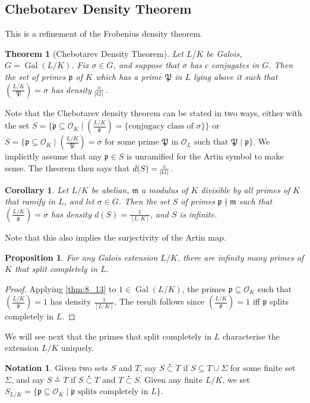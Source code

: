 \documentclass[11pt]{article}
\theoremstyle{definition}
\newtheorem{notation}[definition]{Notation}
\theoremstyle{plain}
\newtheorem{theorem}[definition]{Theorem}
\newtheorem{proposition}[definition]{Proposition}
\newtheorem{corollary}[definition]{Corollary}
\theoremstyle{remark}
\DeclareMathOperator{\Gal}{Gal}
\newcommand{\cO}{\mathcal{O}}
\newcommand{\cp}{\mathfrak{P}}
\newcommand{\fp}{\mathfrak{p}}
\newcommand{\fm}{\mathfrak{m}}
\newcommand{\leg}[2]{\left(\frac{#1}{#2}\right)}
\newcommand{\subsetdot}{\stackrel{\centerdot}{\subset}}
\newcommand{\eqdot}{\stackrel{\centerdot}{=}}
\begin{document}
\subsection{Chebotarev Density Theorem}
This is a refinement of the Frobenius density theorem.

\begin{theorem}[Chebotarev Density Theorem]\label{thm:8_13}
    Let $L/K$ be Galois, $G = \Gal(L/K)$. Fix $\sigma \in G$, and suppose that $\sigma$ has $c$ conjugates in $G$. Then the set of primes $\fp$ of $K$ which has a prime $\cp$ in $L$ lying above it such that $\leg{L/K}{\cp} = \sigma$ has density $\frac{c}{\abs{G}}$.
\end{theorem}

Note that the Chebotarev density theorem can be stated in two ways, either with the set $S = \{\fp \subseteq \cO_K \mid \leg{L/K}{\fp} = \{\text{conjugacy class of } \sigma\}\}$ or $S = \{\fp \subseteq \cO_K \mid \leg{L/K}{\cp} = \sigma \text{ for some prime } \cp \text{ in } \cO_L \text{ such that } \cp \mid \fp\}$. We implicitly assume that any $\fp \in S$ is unramified for the Artin symbol to make sense. The theorem then says that $d(S) = \frac{c}{\abs{G}}$.

\begin{corollary}\label{cor:8_14}
    Let $L/K$ be abelian, $\fm$ a modulus of $K$ divisible by all primes of $K$ that ramify in $L$, and let $\sigma \in G$. Then the set $S$ of primes $\fp \nmid \fm$ such that $\leg{L/K}{\fp} = \sigma$ has density $d(S) = \frac{1}{[L : K]}$, and $S$ is infinite.
\end{corollary}

\noindent Note that this also implies the surjectivity of the Artin map.

\begin{proposition}\label{prop:8_15}
    For any Galois extension $L/K$, there are infinity many primes of $K$ that split completely in $L$.
\end{proposition}
\begin{proof}
    Applying \autoref{thm:8_13} to $1 \in \Gal(L/K)$, the primes $\fp \subseteq \cO_K$ such that $\leg{L/K}{\fp} = 1$ has density $\frac{1}{[L:K]}$. The result follows since $\leg{L/K}{\fp} = 1$ iff $\fp$ splits completely in $L$.
\end{proof}

We will see next that the primes that split completely in $L$ characterise the extension $L/K$ uniquely.

\begin{notation}\label{not:8_16}
    Given two sets $S$ and $T$, say $S \subsetdot T$ if $S \subseteq T \cup \Sigma$ for some finite set $\Sigma$, and say $S \eqdot T$ if $S \subsetdot T$ and $T \subsetdot S$. Given any finite $L/K$, we set $S_{L/K} = \{\fp \subseteq \cO_K \mid \fp \text{ splits completely in } L\}$.
\end{notation}
\end{document}
